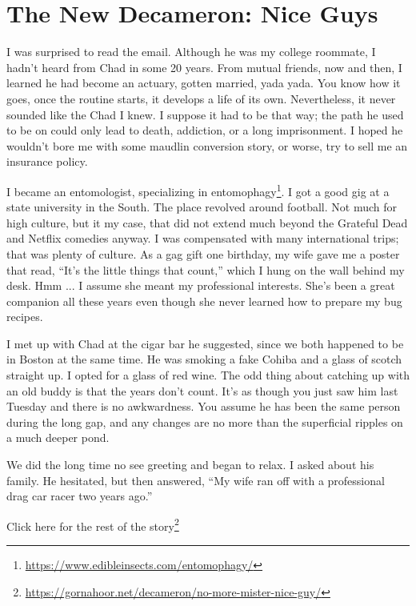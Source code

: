 \section{The New Decameron: Nice Guys}

I was surprised to read the email. Although he was my college roommate, I hadn't heard from Chad in some 20 years. From mutual friends, now and then, I learned he had become an actuary, gotten married, yada yada. You know how it goes, once the routine starts, it develops a life of its own. Nevertheless, it never sounded like the Chad I knew. I suppose it had to be that way; the path he used to be on could only lead to death, addiction, or a long imprisonment. I hoped he wouldn't bore me with some maudlin conversion story, or worse, try to sell me an insurance policy.

I became an entomologist, specializing in entomophagy\footnote{\url{https://www.edibleinsects.com/entomophagy/}}. I got a good gig at a state university in the South. The place revolved around football. Not much for high culture, but it my case, that did not extend much beyond the Grateful Dead and Netflix comedies anyway. I was compensated with many international trips; that was plenty of culture. As a gag gift one birthday, my wife gave me a poster that read, ``It's the little things that count,'' which I hung on the wall behind my desk. Hmm ... I assume she meant my professional interests. She's been a great companion all these years even though she never learned how to prepare my bug recipes.

I met up with Chad at the cigar bar he suggested, since we both happened to be in Boston at the same time. He was smoking a fake Cohiba and a glass of scotch straight up. I opted for a glass of red wine. The odd thing about catching up with an old buddy is that the years don't count. It's as though you just saw him last Tuesday and there is no awkwardness. You assume he has been the same person during the long gap, and any changes are no more than the superficial ripples on a much deeper pond.

We did the long time no see greeting and began to relax. I asked about his family. He hesitated, but then answered, ``My wife ran off with a professional drag car racer two years ago.''

Click here for the rest of the story\footnote{\url{https://gornahoor.net/decameron/no-more-mister-nice-guy/}}



